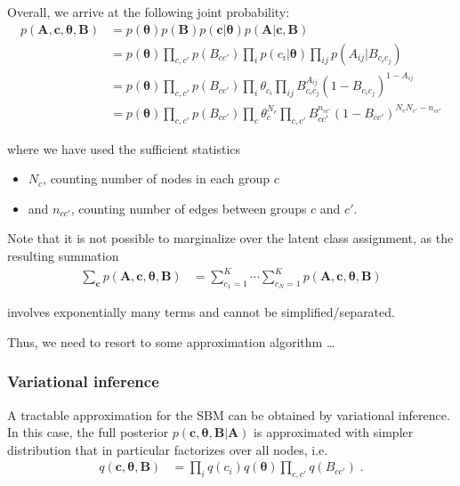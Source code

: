 \documentclass{article}
\renewcommand{\v}[1]{\bm{#1}}
\begin{document}
Overall, we arrive at the following joint probability:
\begin{equation}
\begin{split}
p(\v{A}, \v{c}, \v{\theta}, \v{B})
&= p(\v{\theta}) p(\v{B}) p( \v{c} | \v{\theta} ) p( \v{A} | \v{c}, \v{B} ) \\
&= p(\v{\theta}) \prod_{c,c'} p(B_{c c'}) \prod_i p(c_i | \v{\theta}) \prod_{ij} p(A_{ij} | B_{c_i c_j}) \\
&= p(\v{\theta}) \prod_{c,c'} p(B_{c c'}) \prod_i \theta_{c_i} \prod_{ij} B_{c_i c_j}^{A_{ij}} (1 - B_{c_i c_j})^{1 - {A_{ij}}} \\
&= p(\v{\theta}) \prod_{c,c'} p(B_{c c'}) \prod_c \theta_{c}^{N_c} \prod_{c,c'} B_{c c'}^{n_{c c'}} (1 - B_{c c'})^{N_{c} N_{c'} - n_{c c'}}
\end{split}
\end{equation}

where we have used the sufficient statistics
\begin{itemize}
\item $N_c$, counting number of nodes in each group $c$
\item and $n_{c c'}$, counting number of edges between groups $c$ and
  $c'$.
\end{itemize}

Note that it is not possible to marginalize over the latent class
assignment, as the resulting summation
\begin{equation}
\begin{split}
\sum_{\v{c}} p(\v{A}, \v{c}, \v{\theta}, \v{B})
&= \sum_{c_1 = 1}^K \cdots \sum_{c_N = 1}^K p(\v{A}, \v{c}, \v{\theta}, \v{B})
\end{split}
\end{equation}

involves exponentially many terms and cannot be simplified/separated.

Thus, we need to resort to some approximation algorithm \ldots

\subsubsection{Variational inference}

A tractable approximation for the SBM can be obtained by variational
inference. In this case, the full posterior $p(\v{c}, \v{\theta},
\v{B} | \v{A})$ is approximated with simpler distribution that in
particular factorizes over all nodes, i.e.
\begin{equation}
\begin{split}
q(\v{c}, \v{\theta}, \v{B})
&= \prod_i q(c_i) q(\v{\theta}) \prod_{c,c'} q(B_{cc'}) \; .
\end{split}
\end{equation}
\end{document}
